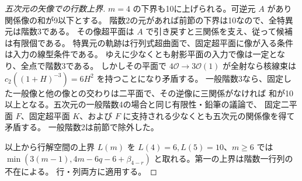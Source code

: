 \begin{proof}[五次元の矢像での行数上界]
$m=4$ の下界も10に上げられる。可逆元 $A$ があり関係像の和が9以下とする。
階数2の元があれば前節の下界は10なので、全特異元は階数3である。
その像超平面は $A$ で引き戻すと三関係を支え、従って候補は有限個である。
特異元の軌跡は行列式超曲面で、固定超平面に像が入る条件は入力の線型条件である。
ゆえに少なくとも射影平面の入力で像は一定となり、全点で階数3である。
しかしその平面で $4\mathcal O\to3\mathcal O(1)$ が全射なら核線束は
$c_2((1+H)^{-3})=6H^2$ を持つことになり矛盾する。
一般階数3なら、固定した一般像と他の像との交わりは二平面で、その逆像に三関係がなければ
和が10以上となる。五次元の一般階数4の場合と同じ有限性・鉛筆の議論で、
固定二平面 $F$、固定超平面 $K$、および $F$ に支持される少なくとも五次元の関係像を得て矛盾する。
一般階数2は前節で除外した。

以上から行解空間の上界 $L(m)$ を $L(4)=6,L(5)=10$、$m\ge6$ では
$\min(3(m-1),4m-6q-6+\beta_{4-r})$ と取れる。第一の上界は階数一行列の不在による。
行・列両方に適用する。
\end{proof}

